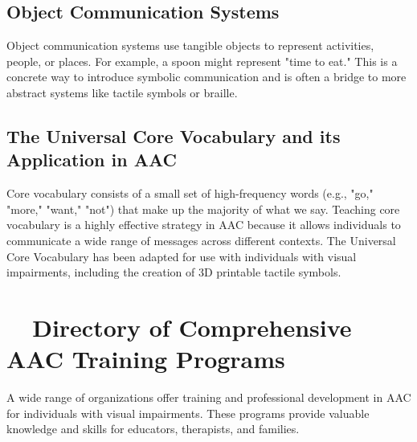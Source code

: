 \subsection{Object Communication Systems}\label{app6:object-comm}
Object communication systems use tangible objects to represent activities, people, or places. For example, a spoon might represent "time to eat." This is a concrete way to introduce symbolic communication and is often a bridge to more abstract systems like tactile symbols or braille.

\subsection{The Universal Core Vocabulary and its Application in AAC}\label{app6:core-vocab}
Core vocabulary consists of a small set of high-frequency words (e.g., "go," "more," "want," "not") that make up the majority of what we say. Teaching core vocabulary is a highly effective strategy in AAC because it allows individuals to communicate a wide range of messages across different contexts. The Universal Core Vocabulary has been adapted for use with individuals with visual impairments, including the creation of 3D printable tactile symbols.

\section{~~Directory of Comprehensive AAC Training Programs}\label{app6:aac-training}
A wide range of organizations offer training and professional development in AAC for individuals with visual impairments. These programs provide valuable knowledge and skills for educators, therapists, and families.

